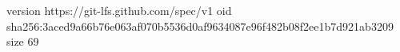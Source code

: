 version https://git-lfs.github.com/spec/v1
oid sha256:3aced9a66b76e063af070b5536d0af9634087e96f482b08f2ee1b7d921ab3209
size 69
